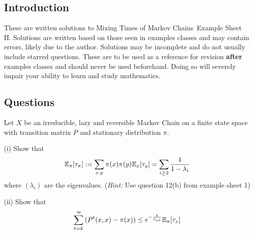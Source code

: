 \documentclass[a4paper]{article}
\def\ntitle{Mixing Times of Markov Chains}
\def\nsheet{II}
\begin{document}
	
	
	\subsection*{Introduction}
	These are written solutions to \ntitle \ Example Sheet \nsheet. Solutions are written based on those seen in examples classes and may contain errors, likely due to the author. Solutions may be incomplete and do not usually include starred questions. These are to be used as a reference for revision \textbf{after} examples classes and should never be used beforehand. Doing so will severely impair your ability to learn and study mathematics.
	\subsection*{Questions}

	\begin{question}[Question 1]
	\end{question}
	
	\begin{question}[Question 5]
	Let $X$ be an irreducible, lazy and reversible Markov Chain on a finite state space with transition matrix $P$ and stationary distribution $\pi$.\\
	\begin{description}
	\item (i) Show that
	\[\E_{\pi}[\tau_{\pi}] := \sum_{x,y}\pi (x) \pi (y) \E_{x}[\tau_{y}] = \sum_{i \geq 2}{\frac{1}{1-\lambda_i}}\]
	where $(\lambda_i)$ are the eigenvalues. (\textit{Hint:} Use question 12(b) from example sheet 1)
	\item (ii) Show that
	\[\sum_{t=k}^\infty{(P^t(x,x) - \pi (x))} \leq e^{-\frac{k}{t_{\text{rel}}}} \E_{\pi}[\tau_x]\]
	\end{description}
	\end{question}
	
\end{document}
